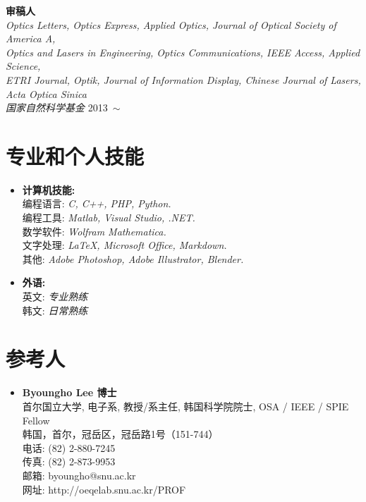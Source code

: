 \documentclass[10pt,a4paper]{moderncv}
\begin{document}
	
\textbf{审稿人} \\
{\em Optics Letters, Optics Express, Applied Optics, Journal of Optical Society of America A, \\
Optics and Lasers in Engineering, Optics Communications, IEEE Access, Applied Science, \\ 
ETRI Journal, Optik, Journal of Information Display,	Chinese Journal of Lasers, Acta Optica Sinica \\
国家自然科学基金
} 
\hfill 2013~$\sim$



\section{专业和个人技能}
\begin{itemize}
\item \textbf{计算机技能:}
    \\编程语言: {\em C, C++, PHP, Python.}
    \\编程工具: {\em Matlab, Visual Studio, .NET.}
    \\数学软件: {\em Wolfram Mathematica.}
    \\文字处理: {\em \LaTeX, Microsoft Office, Markdown.}
    \\其他: {\em Adobe Photoshop, Adobe Illustrator, Blender.}
\item \textbf{外语:}
    \\英文: {\em 专业熟练}
    \\韩文: {\em 日常熟练}
\end{itemize}

\section{参考人}
\begin{itemize}
\item \textbf{Byoungho Lee 博士} \\
	首尔国立大学, 电子系, 教授/系主任, 韩国科学院院士, OSA / IEEE / SPIE Fellow\\
	韩国，首尔，冠岳区，冠岳路1号（151-744） \\
	电话: (82) 2-880-7245 \\
	传真: (82) 2-873-9953 \\
	邮箱: byoungho@snu.ac.kr \\
	网址: {http://oeqelab.snu.ac.kr/PROF}
\end{itemize}
\vspace{3pt}
\end{document}
